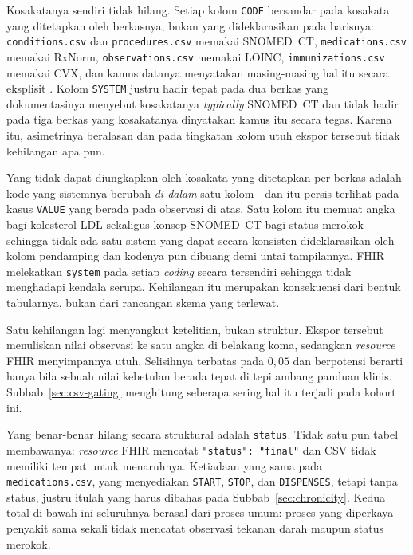 Kosakatanya sendiri tidak hilang. Setiap kolom
\texttt{CODE} bersandar pada kosakata yang ditetapkan oleh berkasnya, bukan yang dideklarasikan
pada barisnya: \texttt{conditions.csv} dan \texttt{procedures.csv} memakai SNOMED~CT,
\texttt{medications.csv} memakai RxNorm, \texttt{observations.csv} memakai LOINC,
\texttt{immunizations.csv} memakai CVX, dan kamus datanya menyatakan masing-masing hal itu
secara eksplisit \cite{synthea_csv_dict}. Kolom \texttt{SYSTEM} justru hadir tepat pada dua
berkas yang dokumentasinya menyebut kosakatanya \emph{typically} SNOMED~CT dan tidak hadir pada
tiga berkas yang kosakatanya dinyatakan kamus itu secara tegas. Karena itu, asimetrinya beralasan
dan pada tingkatan kolom utuh ekspor tersebut tidak kehilangan apa pun.

Yang tidak dapat diungkapkan oleh kosakata yang ditetapkan per berkas adalah kode yang
sistemnya berubah \emph{di dalam} satu kolom---dan itu persis terlihat pada kasus \texttt{VALUE} yang berada pada
observasi di atas. Satu kolom itu memuat angka bagi kolesterol LDL sekaligus konsep SNOMED~CT
bagi status merokok sehingga tidak ada satu sistem yang dapat secara konsisten dideklarasikan oleh
kolom pendamping dan kodenya pun dibuang demi untai tampilannya. FHIR melekatkan
\texttt{system} pada setiap \emph{coding} secara tersendiri sehingga tidak menghadapi kendala
serupa. Kehilangan itu merupakan konsekuensi dari bentuk tabularnya, bukan dari rancangan skema
yang terlewat.

Satu kehilangan lagi menyangkut ketelitian, bukan struktur. Ekspor tersebut menuliskan nilai
observasi ke satu angka di belakang koma, sedangkan \emph{resource} FHIR menyimpannya utuh.
Selisihnya terbatas pada $0{,}05$ dan berpotensi berarti hanya bila sebuah nilai kebetulan
berada tepat di tepi ambang panduan klinis. Subbab~\ref{sec:csv-gating} menghitung seberapa
sering hal itu terjadi pada kohort ini.

Yang benar-benar hilang secara struktural adalah \texttt{status}. Tidak satu pun tabel membawanya:
\emph{resource} FHIR mencatat \texttt{"status": "final"} dan CSV tidak memiliki tempat untuk
menaruhnya. Ketiadaan yang sama pada \texttt{medications.csv}, yang menyediakan \texttt{START},
\texttt{STOP}, dan \texttt{DISPENSES}, tetapi tanpa status, justru itulah yang harus dibahas
pada Subbab~\ref{sec:chronicity}.
Kedua total di bawah ini seluruhnya berasal dari proses umum: proses yang diperkaya penyakit
sama sekali tidak mencatat observasi tekanan darah maupun status merokok.

